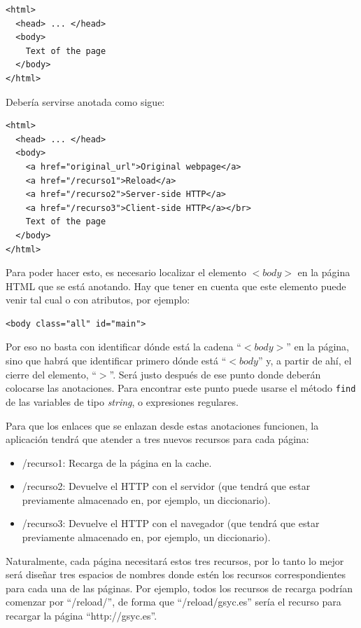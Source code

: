 \begin{verbatim}
<html>
  <head> ... </head>
  <body>
    Text of the page
  </body>
</html>
\end{verbatim}

Debería servirse anotada como sigue:

\begin{verbatim}
<html>
  <head> ... </head>
  <body>
    <a href="original_url">Original webpage</a>
    <a href="/recurso1">Reload</a>
    <a href="/recurso2">Server-side HTTP</a>
    <a href="/recurso3">Client-side HTTP</a></br>
    Text of the page
  </body>
</html>
\end{verbatim}

Para poder hacer esto, es necesario localizar el elemento $<body>$ en la página HTML que se está anotando. Hay que tener en cuenta que este elemento puede venir tal cual o con atributos, por ejemplo:

\begin{verbatim}
<body class="all" id="main">
\end{verbatim}

Por eso no basta con identificar dónde está la cadena ``$<body>$'' en la página, sino que habrá que identificar primero dónde está ``$<body$'' y, a partir de ahí, el cierre del elemento, ``$>$''. Será justo después de ese punto donde deberán colocarse las anotaciones. Para encontrar este punto puede usarse el método \texttt{find} de las variables de tipo \emph{string}, o expresiones regulares.

Para que los enlaces que se enlazan desde estas anotaciones funcionen, la aplicación tendrá que atender a tres nuevos recursos para cada página:

\begin{itemize}
\item /recurso1: Recarga de la página en la cache.
\item /recurso2: Devuelve el HTTP con el servidor (que tendrá que estar previamente almacenado en, por ejemplo, un diccionario).
\item /recurso3: Devuelve el HTTP con el navegador (que tendrá que estar previamente almacenado en, por ejemplo, un diccionario).
\end{itemize}

Naturalmente, cada página necesitará estos tres recursos, por lo tanto lo mejor será diseñar tres espacios de nombres donde estén los recursos correspondientes para cada una de las páginas. Por ejemplo, todos los recursos de recarga podrían comenzar por ``/reload/'', de forma que ``/reload/gsyc.es'' sería el recurso para recargar la página ``http://gsyc.es''.

